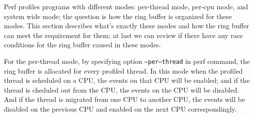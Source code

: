 \documentclass[11pt]{diazessay} %
\def\code#1{\texttt{#1}}
\begin{document}
Perf profiles programs with different modes: per-thread mode, per-cpu mode, and system wide mode; the question is how the ring buffer is organized for these modes. This section describes what's exactly these modes and how the ring buffer can meet the requirement for them; at last we can review if there have any race conditions for the ring buffer caused in these modes.

For the per-thread mode, by specifying option \code{--per--thread} in perf command, the ring buffer is allocated for every profiled thread.  In this mode when the profiled thread is scheduled on a CPU, the events on that CPU will be enabled; and if the thread is cheduled out from the CPU, the events on the CPU will be disabled.  And if the thread is migrated from one CPU to another CPU, the events will be disabled on the previous CPU and enabled on the next CPU correspondingly.
\end{document}
